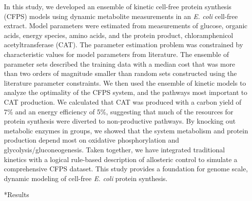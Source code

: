 \documentclass[12pt]{article}
\makeatletter
\renewcommand\section{\@startsection
	{subsection}{2}{0mm}
	{-0.2in}
	{0.05\baselineskip}
	{\normalfont\large\bfseries}}
\makeatother
\begin{document}
In this study, we developed an ensemble of kinetic cell-free protein synthesis (CFPS) models using dynamic metabolite measurements in an \textit{E. coli} cell-free extract.
Model parameters were estimated from measurements of glucose, organic acids, energy species, amino acids, and the protein product, chloramphenicol acetyltransferase (CAT).
The parameter estimation problem was constrained by characteristic values for model parameters from literature.
The ensemble of parameter sets described the training data with a median cost that was more than two orders of magnitude smaller than random sets constructed using the literature parameter constraints.
We then used the ensemble of kinetic models to analyze the optimality of the CFPS system, and the pathways most important to CAT production.
We calculated that CAT was produced with a carbon yield of 7\% and an energy efficiency of 5\%, suggesting that much of the resources for protein synthesis were diverted to non-productive pathways.
By knocking out metabolic enzymes in groups, we showed that the system metabolism and protein production depend most on oxidative phosphorylation and glycolysis\slash gluconeogenesis.
Taken together, we have integrated traditional kinetics with a logical rule-based description of allosteric control to simulate a comprehensive CFPS dataset.
This study provides a foundation for genome scale, dynamic modeling of cell-free \textit{E. coli} protein synthesis.

\clearpage

\section*{Results}
\end{document}
